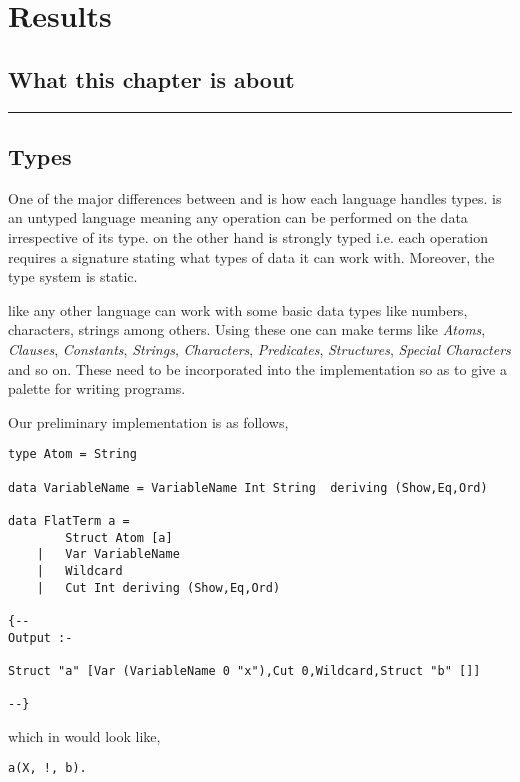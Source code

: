\documentclass[thesis-solanki.tex]{subfiles}
\begin{document}
\chapter{Results}\label{sect:results}


\section{What this chapter is about}

\noindent\rule{\textwidth}{0.5pt}

\section{Types}


One of the major differences between  and  is how each language handles types.
 is an untyped language meaning any operation can be performed on the data irrespective of its
type.
 on the other hand is strongly typed i.e.
each operation requires a signature stating what types of data it can work with.
Moreover, the  type system is static.


 like any other language can work with some basic data types like numbers, characters, strings
among others.
Using these one can make terms like \textit{Atoms}, \textit{Clauses}, \textit{Constants}, \textit{Strings},
\textit{Characters}, \textit{Predicates}, \textit{Structures}, \textit{Special Characters} and so on.
These need to be incorporated into the implementation so as to give a palette for writing programs.

Our preliminary implementation is as follows,
\begin{verbatim}
type Atom = String

data VariableName = VariableName Int String  deriving (Show,Eq,Ord)

data FlatTerm a = 
		Struct Atom [a]
	| 	Var VariableName
	|	Wildcard
	|	Cut Int deriving (Show,Eq,Ord)

{--
Output :-

Struct "a" [Var (VariableName 0 "x"),Cut 0,Wildcard,Struct "b" []]

--}
\end{verbatim}
        
which in  would look like,

\begin{verbatim}
a(X, !, b).
\end{verbatim}
\end{document}
